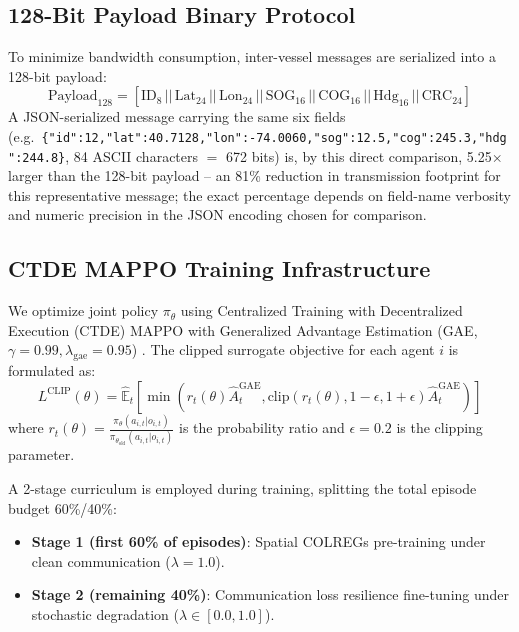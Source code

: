 \documentclass[journal,twocolumn,10pt]{IEEEtran}
\begin{document}
\subsection{128-Bit Payload Binary Protocol}
To minimize bandwidth consumption, inter-vessel messages are serialized into a 128-bit payload:
\begin{equation}
\text{Payload}_{128} = [\text{ID}_{8} \,||\, \text{Lat}_{24} \,||\, \text{Lon}_{24} \,||\, \text{SOG}_{16} \,||\, \text{COG}_{16} \,||\, \text{Hdg}_{16} \,||\, \text{CRC}_{24}]
\end{equation}
A JSON-serialized message carrying the same six fields (e.g.\ \texttt{\{"id":12,"lat":40.7128,"lon":-74.0060,"sog":12.5,"cog":245.3,"hdg":244.8\}}, 84 ASCII characters $=$ 672 bits) is, by this direct comparison, 5.25$\times$ larger than the 128-bit payload -- an 81\% reduction in transmission footprint for this representative message; the exact percentage depends on field-name verbosity and numeric precision in the JSON encoding chosen for comparison.

\subsection{CTDE MAPPO Training Infrastructure}
We optimize joint policy $\pi_\theta$ using Centralized Training with Decentralized Execution (CTDE) MAPPO with Generalized Advantage Estimation (GAE, $\gamma=0.99, \lambda_{\text{gae}}=0.95$) \cite{yu2023mappo, schulman2017proximal}. The clipped surrogate objective for each agent $i$ is formulated as:
\begin{equation}
L^{\text{CLIP}}(\theta) = \hat{\mathbb{E}}_t \left[ \min\left(r_t(\theta)\hat{A}_t^{\text{GAE}}, \text{clip}(r_t(\theta), 1-\epsilon, 1+\epsilon)\hat{A}_t^{\text{GAE}}\right) \right]
\end{equation}
where $r_t(\theta) = \frac{\pi_\theta(a_{i,t}|o_{i,t})}{\pi_{\theta_{\text{old}}}(a_{i,t}|o_{i,t})}$ is the probability ratio and $\epsilon = 0.2$ is the clipping parameter.

A 2-stage curriculum is employed during training, splitting the total episode budget 60\%/40\%:
\begin{itemize}
    \item \textbf{Stage 1 (first 60\% of episodes)}: Spatial COLREGs pre-training under clean communication ($\lambda = 1.0$).
    \item \textbf{Stage 2 (remaining 40\%)}: Communication loss resilience fine-tuning under stochastic degradation ($\lambda \in [0.0, 1.0]$).
\end{itemize}
\end{document}
